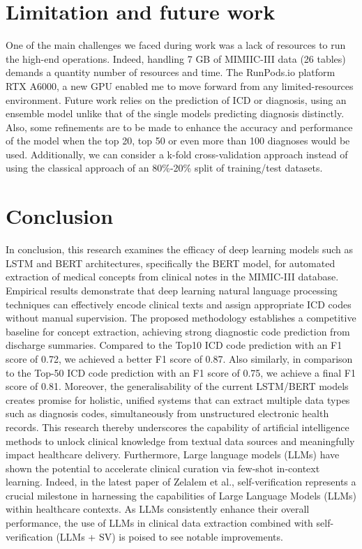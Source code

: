 \documentclass[journal,article,submit,pdftex,moreauthors]{Definitions/mdpi}
\begin{document}
\section{Limitation and future work}\label{sec5}
 One of the main challenges we faced during work was a lack of resources to run the high-end operations. Indeed, handling 7 GB of MIMIIC-III data (26 tables) demands a quantity number of resources and time. The RunPods.io platform RTX A6000, a new GPU enabled me to move forward from any limited-resources environment. Future work relies on the prediction of ICD or diagnosis, using an ensemble model unlike that of the single models predicting diagnosis distinctly. Also, some refinements are to be made to enhance the accuracy and performance of the model when the top 20, top 50 or even more than 100 diagnoses would be used. Additionally, we can consider a k-fold cross-validation approach instead of using the classical approach of an 80\%-20\% split of training/test datasets.

\section{Conclusion}\label{sec6}
In conclusion, this research examines the efficacy of deep learning models such as LSTM and BERT architectures, specifically the BERT model, for automated extraction of medical concepts from clinical notes in the MIMIC-III database. Empirical results demonstrate that deep learning natural language processing techniques can effectively encode clinical texts and assign appropriate ICD codes without manual supervision. The proposed methodology establishes a competitive baseline for concept extraction, achieving strong diagnostic code prediction from discharge summaries. Compared to the Top10 ICD code prediction \cite{ref-journal6} with an F1 score of 0.72, we achieved a better F1 score of 0.87. Also similarly, in comparison to the Top-50 ICD code prediction \cite{ref-journal1}\cite{ref-journal4} with an F1 score of 0.75, we achieve a final F1 score of 0.81. Moreover, the generalisability of the current LSTM/BERT models creates promise for holistic, unified systems that can extract multiple data types such as diagnosis codes, simultaneously from unstructured electronic health records. This research thereby underscores the capability of artificial intelligence methods to unlock clinical knowledge from textual data sources and meaningfully impact healthcare delivery. Furthermore, Large language models (LLMs) have shown the potential to accelerate clinical curation via few-shot in-context learning. 
Indeed, in the latest paper of Zelalem et al.\cite{ref-journal19}, self-verification represents a crucial milestone in harnessing the capabilities of Large Language Models (LLMs) within healthcare contexts. As LLMs consistently enhance their overall performance, the use of LLMs in clinical data extraction combined with self-verification (LLMs + SV) is poised to see notable improvements.
\end{document}
